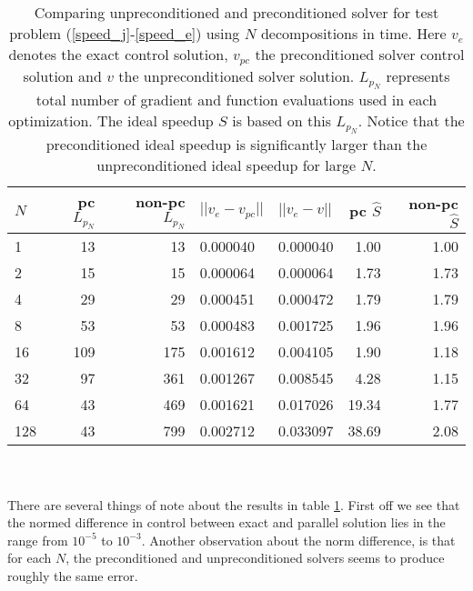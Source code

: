 \begin{table}[h]
\centering
\caption{Comparing unpreconditioned and preconditioned solver for test problem (\ref{speed_j}-\ref{speed_e}) using $N$ decompositions in time. Here $v_e$ denotes the exact control solution, $v_{pc}$ the preconditioned solver control solution and $v$ the unpreconditioned solver solution. $L_{p_N}$ represents total number of gradient and function evaluations used in each optimization. The ideal speedup $\hat S$ is based on this $L_{p_N}$. Notice that the preconditioned ideal speedup is significantly larger than the unpreconditioned ideal speedup for large $N$.}
\label{compare_table}
\begin{tabular}{lrrllrr}
\toprule
{}$N$ &  pc $L_{p_N}$ &  non-pc $L_{p_N}$ &       $||v_e-v_{pc}||$ &  $||v_e-v||$  &  pc $\hat{S}$ &  non-pc $\hat{S}$ \\
\midrule
1   &     13 &      13 &  0.000040 &    0.000040 &    1.00 &        1.00 \\
2   &     15 &      15 &  0.000064 &    0.000064 &    1.73 &        1.73 \\
4   &     29 &      29 &  0.000451 &    0.000472 &    1.79 &        1.79 \\
8   &     53 &      53 &  0.000483 &    0.001725 &    1.96 &        1.96 \\
16  &    109 &     175 &  0.001612 &    0.004105 &    1.90 &        1.18 \\
32  &     97 &     361 &  0.001267 &    0.008545 &    4.28 &        1.15 \\
64  &     43 &     469 &  0.001621 &    0.017026 &   19.34 &        1.77 \\
128 &     43 &     799 &  0.002712 &    0.033097 &   38.69 &        2.08 \\
\bottomrule
\end{tabular}
\end{table}
\\
\\
There are several things of note about the results in table \ref{compare_table}. First off we see that the normed difference in control between exact and parallel solution lies in the range from $10^{-5}$ to $10^{-3}$. Another observation about the norm difference, is that for each $N$, the preconditioned and unpreconditioned solvers seems to produce roughly the same error. 
\\
\\
